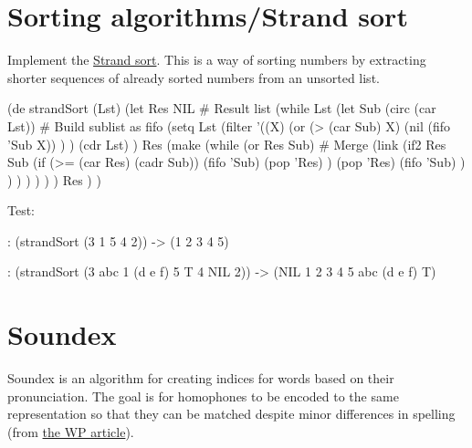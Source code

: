 \pagebreak{}
\section*{Sorting algorithms/Strand sort}

Implement the \href{http://en.wikipedia.org/wiki/Strand\_sort}{Strand
sort}. This is a way of sorting numbers by extracting shorter sequences
of already sorted numbers from an unsorted list.

\begin{wideverbatim}

(de strandSort (Lst)
   (let Res NIL  # Result list
      (while Lst
         (let Sub (circ (car Lst))  # Build sublist as fifo
            (setq
               Lst (filter
                  '((X)
                     (or
                        (> (car Sub) X)
                        (nil (fifo 'Sub X)) ) )
                  (cdr Lst) )
               Res (make
                  (while (or Res Sub)  # Merge
                     (link
                        (if2 Res Sub
                           (if (>= (car Res) (cadr Sub))
                              (fifo 'Sub)
                              (pop 'Res) )
                           (pop 'Res)
                           (fifo 'Sub) ) ) ) ) ) ) )
      Res ) )

Test:

: (strandSort (3 1 5 4 2))
-> (1 2 3 4 5)

: (strandSort (3 abc 1 (d e f) 5 T 4 NIL 2))
-> (NIL 1 2 3 4 5 abc (d e f) T)

\end{wideverbatim}

\pagebreak{}
\section*{Soundex}

Soundex is an algorithm for creating indices for words based on their
pronunciation. The goal is for homophones to be encoded to the same
representation so that they can be matched despite minor differences in
spelling (from \href{http://en.wikipedia.org/wiki/soundex}{the WP
article}).


